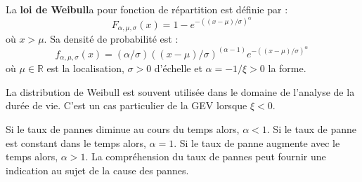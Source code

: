 \begin{f}


La \textbf{loi de Weibull}a pour fonction de répartition est définie par :
$$
F_{\alpha,\mu, \sigma}(x) = 1- e^{-((x-\mu)/\sigma)^\alpha}\,
$$
où $x >\mu$.
Sa densité de probabilité est :
$$
f_{\alpha,\mu,\sigma}(x) = (\alpha/\sigma) ((x-\mu)/\sigma)^{(\alpha-1)} e^{-((x-\mu)/\sigma)^\alpha}\,
$$
où  $\mu\in\mathbb{R}$ est la localisation, $\sigma>0$ d'échelle et  $\alpha=-1/\xi>0 $ la forme.

La distribution de Weibull est souvent utilisée dans le domaine de l'analyse de la durée de vie. C'est un cas particulier de la GEV lorsque $\xi<0$.

Si le taux de pannes diminue au cours du temps alors, $\alpha<1$. Si le taux de panne est constant dans le temps alors, $\alpha=1$. Si le taux de panne augmente avec le temps alors, $\alpha>1$. La compréhension du taux de pannes peut fournir une indication au sujet de la cause des pannes.


\begin{center}
	{\shorthandoff{:!;}	  
}
\end{center}
\end{f}



